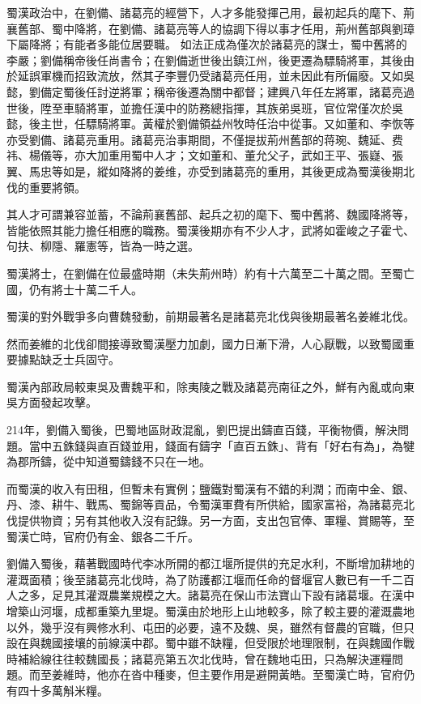 蜀漢政治中，在劉備、諸葛亮的經營下，人才多能發揮己用，最初起兵的麾下、荊襄舊部、蜀中降將，在劉備、諸葛亮等人的協調下得以事才任用，荊州舊部與劉璋下屬降將；有能者多能位居要職。 如法正成為僅次於諸葛亮的謀士，蜀中舊將的李嚴；劉備稱帝後任尚書令；在劉備逝世後出鎮江州，後更遷為驃騎將軍，其後由於延誤軍機而招致流放，然其子李豐仍受諸葛亮任用，並未因此有所偏廢。又如吳懿，劉備定蜀後任討逆將軍；稱帝後遷為關中都督；建興八年任左將軍，諸葛亮過世後，陞至車騎將軍，並擔任漢中的防務總指揮，其族弟吳班，官位常僅次於吳懿，後主世，任驃騎將軍。黃權於劉備領益州牧時任治中從事。又如董和、李恢等亦受劉備、諸葛亮重用。諸葛亮治事期間，不僅提拔荊州舊部的蒋琬、魏延、费祎、楊儀等，亦大加重用蜀中人才；文如董和、董允父子，武如王平、張嶷、張翼、馬忠等如是，縱如降將的姜维，亦受到諸葛亮的重用，其後更成為蜀漢後期北伐的重要將領。

其人才可謂兼容並蓄，不論荊襄舊部、起兵之初的麾下、蜀中舊將、魏國降將等，皆能依照其能力擔任相應的職務。蜀漢後期亦有不少人才，武將如霍峻之子霍弋、句扶、柳隱、羅憲等，皆為一時之選。

蜀漢將士，在劉備在位最盛時期（未失荊州時）約有十六萬至二十萬之間。至蜀亡國，仍有將士十萬二千人。

蜀漢的對外戰爭多向曹魏發動，前期最著名是諸葛亮北伐與後期最著名姜維北伐。

然而姜維的北伐卻間接導致蜀漢壓力加劇，國力日漸下滑，人心厭戰，以致蜀國重要據點缺乏士兵固守。

蜀漢內部政局較東吳及曹魏平和，除夷陵之戰及諸葛亮南征之外，鮮有內亂或向東吳方面發起攻擊。

214年，劉備入蜀後，巴蜀地區財政混亂，劉巴提出鑄直百錢，平衡物價，解決問題。當中五銖錢與直百錢並用，錢面有鑄字「直百五銖」、背有「好右有為」，為犍為郡所鑄，從中知道蜀鑄錢不只在一地。

而蜀漢的收入有田租，但暫未有實例；鹽鐵對蜀漢有不錯的利潤；而南中金、銀、丹、漆、耕牛、戰馬、蜀錦等貢品，令蜀漢軍費有所供給，國家富裕，為諸葛亮北伐提供物資；另有其他收入沒有記錄。另一方面，支出包官俸、軍糧、賞賜等，至蜀漢亡時，官府仍有金、銀各二千斤。

劉備入蜀後，藉著戰國時代李冰所開的都江堰所提供的充足水利，不斷增加耕地的灌溉面積；後至諸葛亮北伐時，為了防護都江堰而任命的督堰官人數已有一千二百人之多，足見其灌溉農業規模之大。諸葛亮在保山市法寶山下設有諸葛堰。在漢中增築山河堰，成都重築九里堤。蜀漢由於地形上山地較多，除了較主要的灌溉農地以外，幾乎沒有興修水利、屯田的必要，遠不及魏、吳，雖然有督農的官職，但只設在與魏國接壤的前線漢中郡。蜀中雖不缺糧，但受限於地理限制，在與魏國作戰時補給線往往較魏國長；諸葛亮第五次北伐時，曾在魏地屯田，只為解決運糧問題。而至姜維時，他亦在沓中種麥，但主要作用是避開黃皓。至蜀漢亡時，官府仍有四十多萬斛米糧。

